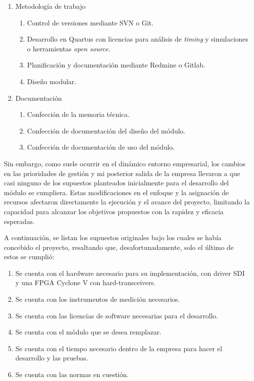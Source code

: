 \begin{enumerate}
      \item Metodología de trabajo
      \begin{enumerate}
          \item Control de versiones mediante SVN o Git.
          \item Desarrollo en Quartus con licencias para análisis de \textit{timing} y simulaciones o herramientas \textit{open source}.
          \item Planificación y documentación mediante Redmine o Gitlab.
          \item Diseño modular.
      \end{enumerate}
      \item Documentación
      \begin{enumerate}
          \item Confección de la memoria técnica.
          \item Confección de documentación del diseño del módulo.
          \item Confección de documentación de uso del módulo.
      \end{enumerate}
  \end{enumerate}

  Sin embargo, como suele ocurrir en el dinámico entorno empresarial, los cambios
  en las prioridades de gestión y mi posterior salida de la empresa llevaron a que
  casi ninguno de los supuestos planteados inicialmente para el desarrollo del
  módulo se cumpliera. Estas modificaciones en el enfoque y la asignación de
  recursos afectaron directamente la ejecución y el avance del proyecto, limitando
  la capacidad para alcanzar los objetivos propuestos con la rapidez y eficacia
  esperadas.

  A continuación, se listan los supuestos originales bajo los cuales se había
  concebido el proyecto, resaltando que, desafortunadamente, solo el último de
  estos se cumplió:

  \begin{enumerate}
      \item Se cuenta con el hardware necesario para su implementación, con driver SDI y una FPGA Cyclone V con hard-transceivers.
      \item Se cuenta con los instrumentos de medición necesarios.
      \item Se cuenta con las licencias de software necesarias para el desarrollo.
      \item Se cuenta con el módulo que se desea remplazar.
      \item Se cuenta con el tiempo necesario dentro de la empresa para hacer el desarrollo y las pruebas.
      \item Se cuenta con las normas en cuestión.
  \end{enumerate}

